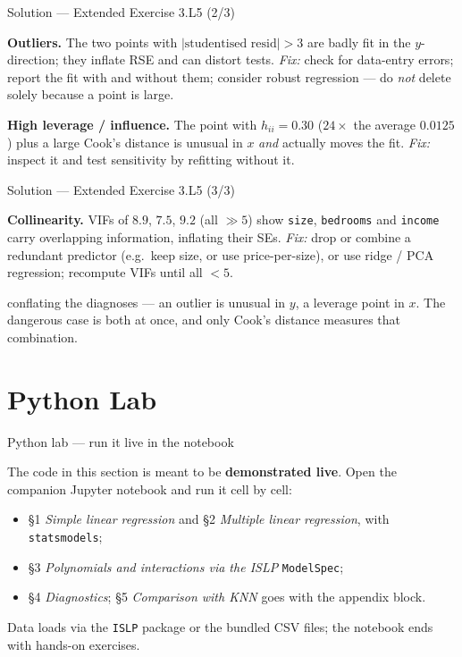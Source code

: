 \documentclass[aspectratio=169,11pt]{beamer}
\begin{document}
\begin{frame}{Solution --- Extended Exercise 3.L5 (2/3)}
  \begin{solutionbox}
    \textbf{Outliers.} The two points with $|\text{studentised resid}|>3$
    are badly fit in the $y$-direction; they inflate RSE and can distort
    tests. \emph{Fix:} check for data-entry errors; report the fit with
    and without them; consider robust regression --- do \emph{not} delete
    solely because a point is large.

    \textbf{High leverage / influence.} The point with $h_{ii}=0.30$
    ($24\times$ the average $0.0125$) plus a large Cook's distance is
    unusual in $x$ \emph{and} actually moves the fit. \emph{Fix:} inspect
    it and test sensitivity by refitting without it.
  \end{solutionbox}
\end{frame}

\begin{frame}{Solution --- Extended Exercise 3.L5 (3/3)}
  \begin{solutionbox}
    \textbf{Collinearity.} VIFs of $8.9$, $7.5$, $9.2$ (all $\gg 5$) show
    \texttt{size}, \texttt{bedrooms} and \texttt{income} carry overlapping
    information, inflating their SEs. \emph{Fix:} drop or combine a
    redundant predictor (e.g.\ keep size, or use price-per-size), or use
    ridge / PCA regression; recompute VIFs until all $<5$.
  \end{solutionbox}
  \begin{mistake}
    conflating the diagnoses --- an outlier is
    unusual in $y$, a leverage point in $x$. The dangerous case is both
    at once, and only Cook's distance measures that combination.
  \end{mistake}
\end{frame}

\section{Python Lab}

\begin{frame}{Python lab --- run it live in the notebook}
  \begin{labnote}
    The code in this section is meant to be \textbf{demonstrated live}. Open the companion Jupyter notebook and run it cell by cell:
    \begin{itemize}
      \item \S1 \emph{Simple linear regression} and \S2 \emph{Multiple linear regression}, with \texttt{statsmodels};
      \item \S3 \emph{Polynomials and interactions via the ISLP} \texttt{ModelSpec};
      \item \S4 \emph{Diagnostics}; \S5 \emph{Comparison with KNN} goes with the appendix block.
    \end{itemize}
    Data loads via the \texttt{ISLP} package or the bundled CSV files; the notebook ends with hands-on exercises.
  \end{labnote}
\end{frame}
\end{document}
